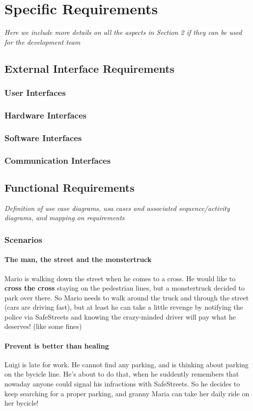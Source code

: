 \documentclass{article}
\begin{document}
\section{Specific Requirements} \textit{Here we include more details on all the aspects in Section 2 if they can be used for the development team}
	\subsection{External Interface Requirements}
		\subsubsection{User Interfaces}
		\subsubsection{Hardware Interfaces}
		\subsubsection{Software Interfaces}
		\subsubsection{Communication Interfaces}
	\subsection{Functional Requirements} \textit{Definition of use case diagrams, usa cases and associated sequence/activity diagrams, and mapping on requirements}
		\subsubsection{Scenarios}
			\paragraph{The man, the street and the monstertruck}
				Mario is walking down the street when he comes to a cross. He would like to \textbf{cross the cross} staying on the pedestrian lines, but a monstertruck decided to park over there. So Mario needs to walk around the truck and through the street (cars are driving fast), but at least he can take a little revenge by notifying the police via SafeStreets and knowing the crazy-minded driver will pay what he deserves! (like some fines)
			\paragraph{Prevent is better than healing}Luigi is late for work. He cannot find any parking, and is thinking about parking on the bycicle line. He's about to do that, when he suddently remembers that nowaday anyone could signal his infractions with SafeStreets. So he decides to keep searching for a proper parking, and granny Maria can take her daily ride on her bycicle!
\end{document}
